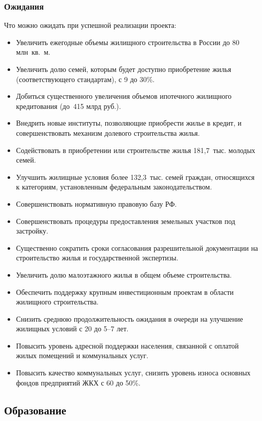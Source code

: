 \documentclass[article, 12pt, russian, oneside]{ncc}
\begin{document}
\subsubsection{Ожидания}

Что можно ожидать при успешной реализации проекта:

\begin{itemize}
\item Увеличить ежегодные объемы жилищного строительства в России до 80 млн~кв.~м.
\item Увеличить долю семей, которым будет доступно приобретение жилья (соответствующего стандартам), с 9 до 30\%.
\item Добиться существенного увеличения объемов ипотечного жилищного кредитования (до~415 млрд руб.).
\item Внедрить новые институты, позволяющие приобрести жилье в кредит, и совершенствовать механизм долевого строительства жилья.
\item Содействовать в приобретении или строительстве жилья 181,7~тыс. молодых семей.
\item Улучшить жилищные условия более 132,3~тыс. семей граждан, относящихся к категориям, установленным федеральным законодательством.
\item Совершенствовать нормативную правовую базу РФ.
\item Совершенствовать процедуры предоставления земельных участков под застройку.
\item Существенно сократить сроки согласования разрешительной документации на строительство жилья и государственной экспертизы.
\item Увеличить долю малоэтажного жилья в общем объеме строительства.
\item Обеспечить поддержку крупным инвестиционным проектам в области жилищного строительства.
\item Снизить среднюю продолжительность ожидания в очереди на улучшение жилищных условий с 20 до 5--7 лет.
\item Повысить уровень адресной поддержки населения, связанной с оплатой жилых помещений и коммунальных услуг.
\item Повысить качество коммунальных услуг, снизить уровень износа основных фондов предприятий ЖКХ с 60 до 50\%.
\end{itemize}

\subsection{Образование}
\end{document}
